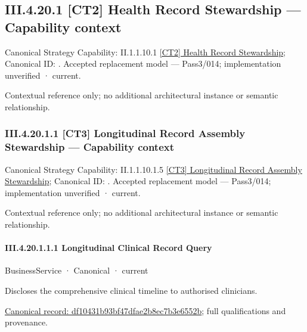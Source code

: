 \subsection*{III.4.20.1 [CT2] Health Record Stewardship — Capability context}
\label{navigation:III.4.20.1}

{\small Canonical Strategy Capability: II.1.1.10.1 \hyperref[element:8532e6d5a687459b9defad56f837fa0a]{[CT2] Health Record Stewardship}; Canonical ID: \texttt{}. Accepted replacement model — Pass3/014; implementation unverified · current.}\par
Contextual reference only; no additional architectural instance or semantic relationship.\par
\subsubsection*{III.4.20.1.1 [CT3] Longitudinal Record Assembly Stewardship — Capability context}
\label{navigation:III.4.20.1.1}

{\small Canonical Strategy Capability: II.1.1.10.1.5 \hyperref[element:4507ca47f4bd40c085e069ac6e42888b]{[CT3] Longitudinal Record Assembly Stewardship}; Canonical ID: \texttt{}. Accepted replacement model — Pass3/014; implementation unverified · current.}\par
Contextual reference only; no additional architectural instance or semantic relationship.\par
\paragraph*{III.4.20.1.1.1 Longitudinal Clinical Record Query}
\label{navigation:III.4.20.1.1.1}

\label{element:df10431b93bf47dfae2b8ec7b3e6552b}
{\small BusinessService · Canonical · current}\par

Discloses the comprehensive clinical timeline to authorised clinicians.


{\footnotesize \href{../../../../../../../../continuum/business/business-service/df10431b93bf47dfae2b8ec7b3e6552b.md}{Canonical record: df10431b93bf47dfae2b8ec7b3e6552b}; full qualifications and provenance.}\par
